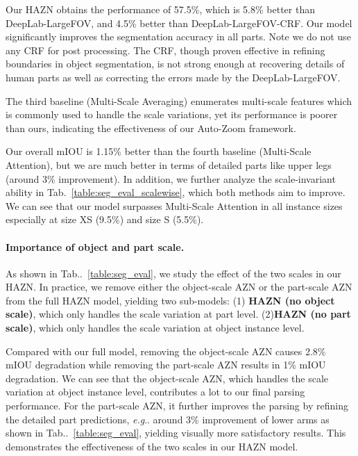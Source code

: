 \documentclass[runningheads]{llncs}
\makeatletter
\newcommand{\tabref}[1]{Tab\onedot~\ref{#1}}
\DeclareRobustCommand\onedot{\futurelet\@let@token\@onedot}
\def\@onedot{\ifx\@let@token.\else.\null\fi\xspace}
\def\eg{\emph{e.g}\onedot} \def\Eg{\emph{E.g}\onedot}
\makeatother
\begin{document}
Our HAZN obtains the performance of 57.5\%, which is 5.8\% better than DeepLab-LargeFOV, and 4.5\% better than DeepLab-LargeFOV-CRF. Our model significantly improves the segmentation accuracy in all parts. Note we do not use any CRF for post processing. The CRF, though proven effective in refining boundaries in object segmentation, is not strong enough at recovering details of human parts as well as correcting the errors made by the DeepLab-LargeFOV. 

The third baseline (Multi-Scale Averaging) enumerates multi-scale features which is commonly used to handle the scale variations, yet its performance is poorer than ours, indicating the effectiveness of our Auto-Zoom framework.

Our overall mIOU is 1.15\% better than the fourth baseline (Multi-Scale Attention), but we are much better in terms of detailed parts like upper legs (around 3\% improvement). In addition, we further analyze the scale-invariant ability in Tab.~\ref{table:seg_eval_scalewise}, which both methods aim to improve. We can see that our model surpasses Multi-Scale Attention in all instance sizes especially at size XS (9.5\%) and size S (5.5\%). 

\paragraph{Importance of object and part scale.}
As shown in \tabref{table:seg_eval}, we study the effect of the two scales in our HAZN.
In practice, we remove either  the object-scale AZN or the part-scale AZN from the full HAZN model, yielding two sub-models: (1) \textbf{HAZN (no object scale)}, which only handles the scale variation at part level. (2)\textbf{HAZN (no part scale)}, which only handles the scale variation at object instance level. 

Compared with our full model, removing the object-scale AZN causes 2.8\% mIOU degradation while removing the part-scale AZN results in 1\% mIOU degradation. 
We can see that the object-scale AZN, which handles the scale variation at object instance level, contributes a lot to our final parsing performance. For the part-scale AZN, it further improves the parsing by refining the detailed part predictions, \eg around 3\% improvement of lower arms as shown in \tabref{table:seg_eval}, yielding visually more satisfactory results. This demonstrates the effectiveness of the two scales in our HAZN model.
\end{document}
